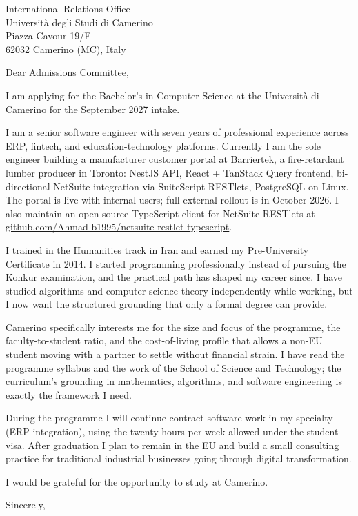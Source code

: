 




\begin{letter}{
  International Relations Office\\
  Università degli Studi di Camerino\\
  Piazza Cavour 19/F\\
  62032 Camerino (MC), Italy
}

\opening{Dear Admissions Committee,}

I am applying for the Bachelor's in Computer Science at the Università di Camerino for the September 2027 intake.

I am a senior software engineer with seven years of professional experience across ERP, fintech, and education-technology platforms. Currently I am the sole engineer building a manufacturer customer portal at Barriertek, a fire-retardant lumber producer in Toronto: NestJS API, React + TanStack Query frontend, bi-directional NetSuite integration via SuiteScript RESTlets, PostgreSQL on Linux. The portal is live with internal users; full external rollout is in October 2026. I also maintain an open-source TypeScript client for NetSuite RESTlets at \href{https://github.com/Ahmad-b1995/netsuite-restlet-typescript}{github.com/Ahmad-b1995/netsuite-restlet-typescript}.

I trained in the Humanities track in Iran and earned my Pre-University Certificate in 2014. I started programming professionally instead of pursuing the Konkur examination, and the practical path has shaped my career since. I have studied algorithms and computer-science theory independently while working, but I now want the structured grounding that only a formal degree can provide.

Camerino specifically interests me for the size and focus of the programme, the faculty-to-student ratio, and the cost-of-living profile that allows a non-EU student moving with a partner to settle without financial strain. I have read the programme syllabus and the work of the School of Science and Technology; the curriculum's grounding in mathematics, algorithms, and software engineering is exactly the framework I need.

During the programme I will continue contract software work in my specialty (ERP integration), using the twenty hours per week allowed under the student visa. After graduation I plan to remain in the EU and build a small consulting practice for traditional industrial businesses going through digital transformation.

I would be grateful for the opportunity to study at Camerino.

\closing{Sincerely,}

\end{letter}


